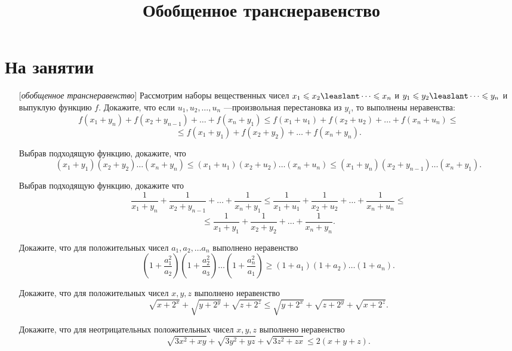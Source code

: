 \documentclass[a4paper,12pt,leqno]{article}
\title{\textbf{Обобщенное транснеравенство}}
\date{}
\begin{document}
	\parskip=0mm
	\linespread{1}
	\maketitle
	
	
	\newcommand{\z}{\addtocounter{zadacha}{1}%
		\boxed{\arabic{zadacha}} }
	\section*{На занятии}
	
    \newcommand{\hw}{\addtocounter{zadacha}{1}%
	\text{ДЗ }\boxed{\arabic{zadacha}} }

    \begin{enumerate}
        \item[\z] [\textit{обобщенное транснеравенство}] Рассмотрим наборы вещественных чисел $x_1 \leqslant x_2 \leaslant \dots \leqslant x_n$ и
        $y_1 \leqslant y_2 \leaslant \dots \leqslant y_n$ и выпуклую функцию $f$. Докажите, что если $u_1, u_2, \dots, u_n$ ---произвольная перестановка из $y_i$, то выполнены неравенства:
        $$f(x_1+y_{n}) + f(x_2+y_{n-1}) + \dots + f(x_n+y_1) \leqslant f(x_1+u_1) + f(x_2+u_2) + \dots + f(x_n+u_n) \leqslant$$ $$\leqslant f(x_1+y_1) + f(x_2+y_2) + \dots + f(x_n+y_n).$$
        
        \item[\z] Выбрав подходящую функцию, докажите, что 
        $$(x_1+y_1)(x_2+y_2)\dots(x_n+y_n) \leqslant (x_1+u_1)(x_2+u_2)\dots (x_n+u_n)\leqslant (x_1+y_n)(x_2+y_{n-1})\dots (x_n+y_1).$$ 
    
        \item[\z] Выбрав подходящую функцию, докажите что
        $$\frac{1}{x_1+y_n} + \frac{1}{x_2+y_{n-1}} + \dots + \frac{1}{x_n+y_1} \leqslant \frac{1}{x_1+u_1} + \frac{1}{x_2+u_{2}} + \dots + \frac{1}{x_n+u_n} \leqslant $$ $$\leqslant \frac{1}{x_1+y_1} + \frac{1}{x_2+y_{2}} + \dots + \frac{1}{x_n+y_n}.$$ 

        \item[\z] Докажите, что для положительных чисел $a_1, a_2, \dots a_n$ выполнено неравенство
        $$\left(1+\frac{a_1^2}{a_2}\right)\left(1+\frac{a_2^2}{a_3}\right)\dots \left(1+\frac{a_n^2}{a_1}\right) \geqslant (1+a_1)(1+a_2)\dots(1+a_n).$$ 

        \item[\z] Докажите, что для положительных чисел $x, y, z$ выполнено неравенство
        $$\sqrt{x+2^x} + \sqrt{y+2^y} + \sqrt{z+2^z} \leqslant \sqrt{y+2^x} + \sqrt{z + 2^y} + \sqrt{x + 2^z}.$$ 

        \item[\z] Докажите, что для неотрицательных положительных чисел $x, y, z$ выполнено неравенство
        $$\sqrt{3x^2 + xy} + \sqrt{3y^2 +yz} + \sqrt{3z^2+zx} \leqslant 2(x+y+z).$$ 

    \end{enumerate}

    

	
	
	
	
	
	
	
	
	
	
	
	
	
	
	
	
	
	
	
	
	
	
	
	
	
	
	
\end{document}
